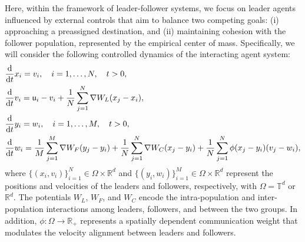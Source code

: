 \documentclass[10pt, reqno]{amsart}
\theoremstyle{definition}
\theoremstyle{remark}
\numberwithin{equation}{section}
\newcommand{\U}{\mathsf{u}}
\newcommand{\ddt}{\frac{\textnormal{d}}{\textnormal{d}t}}
\newcommand{\R}{\mathbb{R}}
\newcommand{\T}{\mathbb{T}}
\begin{document}
Here, within the framework of leader-follower systems, we focus on leader agents influenced by external controls that aim to balance two competing goals: (i) approaching a preassigned destination, and (ii) maintaining cohesion with the follower population, represented by the empirical center of mass. Specifically, we will consider the following controlled dynamics of the interacting agent system:
\begin{equation} \label{eq:main-with-u}
\begin{split}
    &\ddt x_i = v_i, \quad i=1,\dots, N, \quad t > 0,\\
    &\ddt v_i = \U_i-v_i + \frac{1}{N}\sum_{j=1}^N \nabla W_L (x_j-x_i),\\
    &\ddt y_i = w_i, \quad i=1,\dots, M, \quad t > 0, \\
    &\ddt w_i = \frac{1}{M}\sum_{j=1}^M \nabla W_F(y_j-y_i) + \frac{1}{N}\sum_{j=1}^N \nabla W_C(x_j - y_i) + \frac{1}{N}\sum_{j=1}^N \phi(x_j - y_i) (v_j - w_i),
\end{split}
\end{equation}
where $\{(x_i, v_i)\}_{i=1}^N\in\Omega\times \R^d$ and $\{(y_i, w_i)\}_{i=1}^M\in\Omega\times \R^d$ represent the positions and velocities of the leaders and followers, respectively, with $\Omega = \T^d$ or $\R^d$. The potentials $W_L$, $W_F$, and $W_C$ encode the intra-population and inter-population interactions among leaders, followers, and between the two groups. In addition, $\phi: \Omega \to \R_+$ represents a spatially dependent communication weight that modulates the velocity alignment between leaders and followers.
\end{document}
